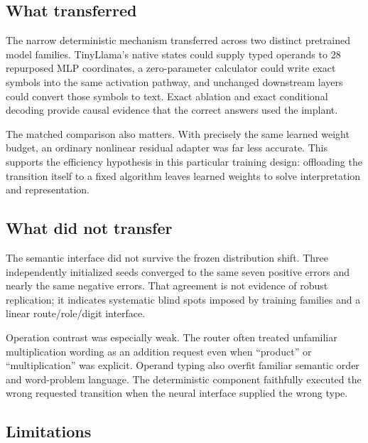\documentclass[11pt]{article}
\begin{document}
\subsection{What transferred}

The narrow deterministic mechanism transferred across two distinct pretrained
model families. TinyLlama's native states could supply typed operands to 28
repurposed MLP coordinates, a zero-parameter calculator could write exact
symbols into the same activation pathway, and unchanged downstream layers
could convert those symbols to text. Exact ablation and exact conditional
decoding provide causal evidence that the correct answers used the implant.

The matched comparison also matters. With precisely the same learned weight
budget, an ordinary nonlinear residual adapter was far less accurate. This
supports the efficiency hypothesis in this particular training design:
offloading the transition itself to a fixed algorithm leaves learned weights
to solve interpretation and representation.

\subsection{What did not transfer}

The semantic interface did not survive the frozen distribution shift.
Three independently initialized seeds converged to the same seven positive
errors and nearly the same negative errors. That agreement is not evidence of
robust replication; it indicates systematic blind spots imposed by training
families and a linear route/role/digit interface.

Operation contrast was especially weak. The router often treated unfamiliar
multiplication wording as an addition request even when ``product'' or
``multiplication'' was explicit. Operand typing also overfit familiar semantic
order and word-problem language. The deterministic component faithfully
executed the wrong requested transition when the neural interface supplied the
wrong type.

\subsection{Limitations}
\end{document}
